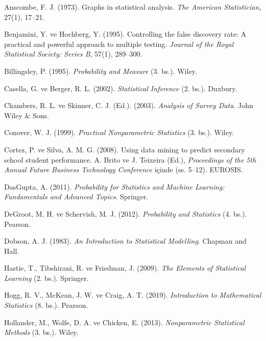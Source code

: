  Anscombe, F. J. (1973). Graphs in statistical analysis. \textit{The American Statistician}, 27(1), 17--21.

 Benjamini, Y. ve Hochberg, Y. (1995). Controlling the false discovery rate: A practical and powerful approach to multiple testing. \textit{Journal of the Royal Statistical Society: Series B}, 57(1), 289--300.

 Billingsley, P. (1995). \textit{Probability and Measure} (3. bs.). Wiley.

 Casella, G. ve Berger, R. L. (2002). \textit{Statistical Inference} (2. bs.). Duxbury.

 Chambers, R. L. ve Skinner, C. J. (Ed.). (2003). \textit{Analysis of Survey Data}. John Wiley \& Sons.

 Conover, W. J. (1999). \textit{Practical Nonparametric Statistics} (3. bs.). Wiley.

 Cortez, P. ve Silva, A. M. G. (2008). Using data mining to predict secondary school student performance. A. Brito ve J. Teixeira (Ed.), \textit{Proceedings of the 5th Annual Future Business Technology Conference} içinde (ss. 5--12). EUROSIS.

 DasGupta, A. (2011). \textit{Probability for Statistics and Machine Learning: Fundamentals and Advanced Topics}. Springer.

 DeGroot, M. H. ve Schervish, M. J. (2012). \textit{Probability and Statistics} (4. bs.). Pearson.

 Dobson, A. J. (1983). \textit{An Introduction to Statistical Modelling}. Chapman and Hall.

 Hastie, T., Tibshirani, R. ve Friedman, J. (2009). \textit{The Elements of Statistical Learning} (2. bs.). Springer.

 Hogg, R. V., McKean, J. W. ve Craig, A. T. (2019). \textit{Introduction to Mathematical Statistics} (8. bs.). Pearson.

 Hollander, M., Wolfe, D. A. ve Chicken, E. (2013). \textit{Nonparametric Statistical Methods} (3. bs.). Wiley.

